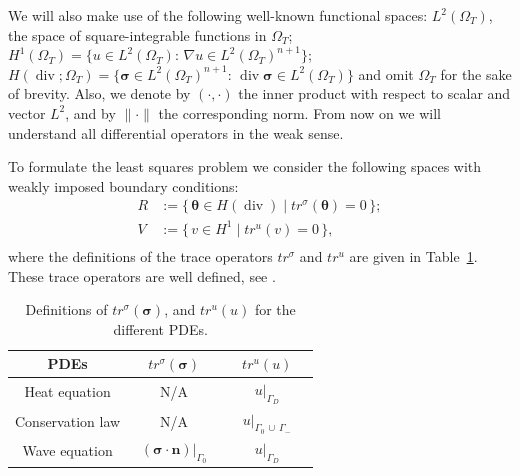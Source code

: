 \documentclass[a4paper,12pt]{amsart}
\numberwithin{equation}{section}
\renewcommand{\div}{\operatorname{div}}
\def\bn{{\mathbf n}}
\def\btheta{{\boldsymbol \theta}}
\def\bsigma{{\boldsymbol \sigma}}
\begin{document}
We will also make use of the following well-known functional spaces: $L^2(\Omega_T)$, the space of square-integrable functions in $\Omega_T$; $H^1(\Omega_T) = \{ u \in L^2(\Omega_T) : \, \nabla u \in L^2(\Omega_T)^{n+1} \} $; $H(\div; \Omega_T) = \{ \bsigma \in L^2(\Omega_T)^{n+1} : \, \div \bsigma \in L^2(\Omega_T) \}$ and omit $\Omega_T$ for the sake of brevity. Also, we denote by  $(\cdot,\cdot)$ the inner product with respect to scalar and vector $L^2$, and by $\|\cdot \|$ the corresponding norm. From now on we will understand all differential operators in the weak sense. %

To formulate the least squares problem  we  consider the following spaces with weakly imposed boundary conditions:
\begin{equation}
\begin{split}
R & := \{\,\btheta \in H(\div) \;|\; tr^\sigma(\btheta) = 0\,\};\\
V & := \{\,v \in H^1 \;|\; tr^u(v) = 0\,\},\\
\end{split}
\label{eq:spaces}
\end{equation}
where the definitions of the trace operators $tr^{\sigma}$ and $tr^u$ are given in Table~\ref{tab:FOSLS_operators}. These trace operators are well defined, see \cite{gatica}. 

\begin{table}[h]
\caption{Definitions of $tr^{\sigma}(\bsigma)$, and $tr^u(u)$ for the different PDEs.}
\label{tab:FOSLS_operators}
\begin{tabular}{ |c||c|c|} \hline
PDEs & $\quad tr^{\sigma}(\bsigma) \quad$ & $\quad tr^u(u) \quad$  \\ \hline
Heat equation & N/A & $u|_{\Gamma_D}$ \\ \hline
Conservation law  & N/A & $u|_{\Gamma_0\,\cup\,\Gamma_-}$ \\ \hline
Wave equation     &  $(\bsigma\cdot\bn)|_{\Gamma_0}$ & $u|_{\Gamma_D}$  \\ \hline
\end{tabular}
\end{table}
\end{document}
